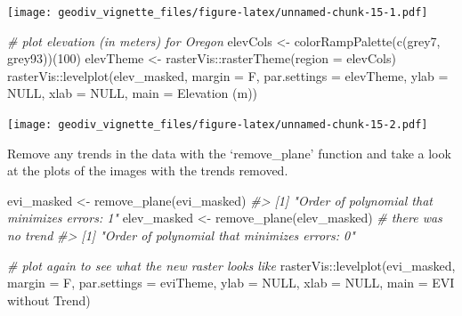 \documentclass[
]{article}
\newenvironment{Shaded}{\begin{snugshade}}{\end{snugshade}}
\newcommand{\AttributeTok}[1]{\textcolor[rgb]{0.77,0.63,0.00}{#1}}
\newcommand{\CommentTok}[1]{\textcolor[rgb]{0.56,0.35,0.01}{\textit{#1}}}
\newcommand{\ConstantTok}[1]{\textcolor[rgb]{0.00,0.00,0.00}{#1}}
\newcommand{\DecValTok}[1]{\textcolor[rgb]{0.00,0.00,0.81}{#1}}
\newcommand{\FunctionTok}[1]{\textcolor[rgb]{0.00,0.00,0.00}{#1}}
\newcommand{\NormalTok}[1]{#1}
\newcommand{\OtherTok}[1]{\textcolor[rgb]{0.56,0.35,0.01}{#1}}
\newcommand{\SpecialCharTok}[1]{\textcolor[rgb]{0.00,0.00,0.00}{#1}}
\newcommand{\StringTok}[1]{\textcolor[rgb]{0.31,0.60,0.02}{#1}}
\begin{document}
\texttt{[image: geodiv\_vignette\_files/figure-latex/unnamed-chunk-15-1.pdf]}

\begin{Shaded}
\begin{Highlighting}[]

\CommentTok{\# plot elevation (in meters) for Oregon}
\NormalTok{elevCols }\OtherTok{\textless{}{-}} \FunctionTok{colorRampPalette}\NormalTok{(}\FunctionTok{c}\NormalTok{(}\StringTok{\textquotesingle{}grey7\textquotesingle{}}\NormalTok{, }\StringTok{\textquotesingle{}grey93\textquotesingle{}}\NormalTok{))(}\DecValTok{100}\NormalTok{)}
\NormalTok{elevTheme }\OtherTok{\textless{}{-}}\NormalTok{ rasterVis}\SpecialCharTok{::}\FunctionTok{rasterTheme}\NormalTok{(}\AttributeTok{region =}\NormalTok{ elevCols)}
\NormalTok{rasterVis}\SpecialCharTok{::}\FunctionTok{levelplot}\NormalTok{(elev\_masked, }\AttributeTok{margin =}\NormalTok{ F, }\AttributeTok{par.settings =}\NormalTok{ elevTheme, }
                     \AttributeTok{ylab =} \ConstantTok{NULL}\NormalTok{, }\AttributeTok{xlab =} \ConstantTok{NULL}\NormalTok{, }\AttributeTok{main =} \StringTok{\textquotesingle{}Elevation (m)\textquotesingle{}}\NormalTok{)}
\end{Highlighting}
\end{Shaded}

\texttt{[image: geodiv\_vignette\_files/figure-latex/unnamed-chunk-15-2.pdf]}

Remove any trends in the data with the `remove\_plane' function and take
a look at the plots of the images with the trends removed.

\begin{Shaded}
\begin{Highlighting}[]
\NormalTok{evi\_masked }\OtherTok{\textless{}{-}} \FunctionTok{remove\_plane}\NormalTok{(evi\_masked)}
\CommentTok{\#\textgreater{} [1] "Order of polynomial that minimizes errors: 1"}
\NormalTok{elev\_masked }\OtherTok{\textless{}{-}} \FunctionTok{remove\_plane}\NormalTok{(elev\_masked) }\CommentTok{\# there was no trend}
\CommentTok{\#\textgreater{} [1] "Order of polynomial that minimizes errors: 0"}

\CommentTok{\# plot again to see what the new raster looks like}
\NormalTok{rasterVis}\SpecialCharTok{::}\FunctionTok{levelplot}\NormalTok{(evi\_masked, }\AttributeTok{margin =}\NormalTok{ F, }\AttributeTok{par.settings =}\NormalTok{ eviTheme, }
                     \AttributeTok{ylab =} \ConstantTok{NULL}\NormalTok{, }\AttributeTok{xlab =} \ConstantTok{NULL}\NormalTok{, }\AttributeTok{main =} \StringTok{\textquotesingle{}EVI without Trend\textquotesingle{}}\NormalTok{)}
\end{Highlighting}
\end{Shaded}
\end{document}
